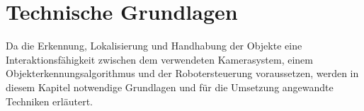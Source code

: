 \chapter{Technische Grundlagen}

Da die Erkennung, Lokalisierung und Handhabung der Objekte eine Interaktionsfähigkeit zwischen dem verwendeten Kamerasystem, einem Objekterkennungsalgorithmus und der Robotersteuerung voraussetzen, werden in diesem Kapitel notwendige Grundlagen und für die Umsetzung angewandte Techniken erläutert.





